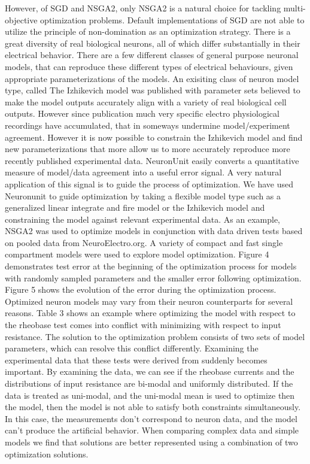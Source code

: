 \begin{itemize}
However, of SGD and NSGA2, only NSGA2 is a natural choice for tackling multi-objective optimization problems. Default implementations of SGD are not able to utilize the principle of non-domination as an optimization strategy.%
There is a great diversity of real biological neurons, all of which differ substantially in their electrical behavior. There are a few different classes of general purpose neuronal models, that can reproduce these different types of electrical behaviours, given appropriate parameterizations of the models.\newline
\newline
An exisiting class of neuron model type, called The Izhikevich model was published with parameter sets believed to make the model outputs accurately align with a variety of real biological cell outputs. However since publication much very specific electro physiological recordings have accumulated, that in someways undermine model/experiment agreement. However it is now possible to constrain the Izhikevich model and find new parameterizations that more allow us to more accurately reproduce more recently published experimental data.\newline
\newline
NeuronUnit easily converts a quantitative measure of model/data agreement into a useful error signal. A very natural application of this signal is to guide the process of optimization. We have used Neuronunit to guide optimization by taking a flexible model type such as a generalized linear integrate and fire model or the Izhikevich model and constraining the model against relevant experimental data. As an example, NSGA2 was used to optimize models in conjunction with data driven tests based on pooled data from NeuroElectro.org. A variety of compact and fast single compartment models were used to explore model optimization. Figure 4 demonstrates test error at the beginning of the optimization process for models with randomly sampled parameters and the smaller error following optimization. Figure 5 shows the evolution of the error during the optimization process. \newline
\newline
Optimized neuron models may vary from their neuron counterparts for several reasons. Table 3 shows an example where optimizing the model with respect to the rheobase test comes into conflict with minimizing with respect to input resistance. The solution to the optimization problem consists of two sets of model parameters, which can resolve this conflict differently. Examining the experimental data that these tests were derived from suddenly becomes important. By examining the data, we can see if the rheobase currents and the distributions of input resistance are bi-modal and uniformly distributed. If the data is treated as uni-modal, and the uni-modal mean is used to optimize then the model, then the model is not able to satisfy both constraints simultaneously. In this case, the measurements don’t correspond to neuron data, and the model can’t produce the artificial behavior. When comparing complex data and simple models we find that solutions are better represented using a combination of two optimization solutions.\newline

\end{itemize}
